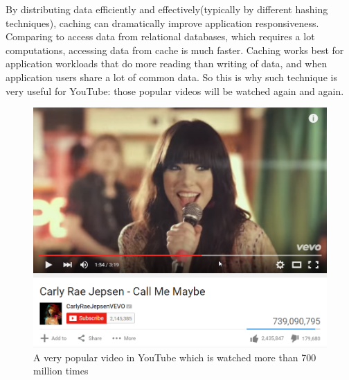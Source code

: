 \documentclass{article}
\begin{document}
By distributing data efficiently and effectively(typically by different hashing techniques), caching can dramatically improve application responsiveness. Comparing to access data from relational databases, which requires a lot computations, accessing data from cache is much faster. Caching works best for application workloads that do more reading than writing of data, and when application users share a lot of common data. So this is why such technique is very useful for YouTube: those popular videos will be watched again and again.
\begin{figure}[H]
	\centering
	\includegraphics[width=\linewidth]{CallMeMaybe.png}
	\caption{A very popular video in YouTube which is watched more than 700 million times}
\end{figure}
\end{document}
